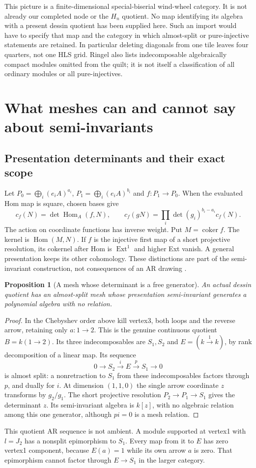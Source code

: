 \documentclass[11pt,oneside,openany]{book}
\newtheorem{proposition}[theorem]{Proposition}
\theoremstyle{definition}\newtheorem{definition}[theorem]{Definition}
\theoremstyle{remark}\newtheorem{remark}[theorem]{Remark}
\begin{document}
This picture is a finite-dimensional special-biserial wind-wheel category.
It is not already our completed node or the $H_n$ quotient. No map identifying
its algebra with a present dessin quotient has been supplied here. Such an
import would have to specify that map and the category in which almost-split
or pure-injective statements are retained. In particular deleting diagonals
from one tile leaves four quarters, not one HLS grid. Ringel also lists
indecomposable algebraically compact modules omitted from the quilt; it is not
itself a classification of all ordinary modules or all pure-injectives.

\section[Meshes and semi-invariants]{What meshes can and cannot say about semi-invariants}
\subsection{Presentation determinants and their exact scope}
Let $P_0=\bigoplus_i(e_iA)^{a_i}$, $P_1=\bigoplus_i(e_iA)^{b_i}$ and
$f:P_1\to P_0$. When the evaluated Hom map is square, chosen bases give
\[
 c_f(N)=\det\operatorname{Hom}_A(f,N),\qquad
 c_f(gN)=\prod_i\det(g_i)^{b_i-a_i}c_f(N).
\]
The action on coordinate functions has inverse weight. Put $M=\operatorname{coker}f$.
The kernel is $\operatorname{Hom}(M,N)$. If $f$ is the injective first map of a
short projective resolution, its cokernel after Hom
is $\operatorname{Ext}^1$ and higher Ext vanish. A general presentation keeps
its other cohomology. These distinctions are part of the semi-invariant
construction, not consequences of an AR drawing \cite{ARBSchofield}.

\begin{proposition}[A mesh whose determinant is a free generator]
\label{arb:freegenerator}
An actual dessin quotient has an almost-split mesh whose presentation
semi-invariant generates a polynomial algebra with no relation.
\end{proposition}
\begin{proof}
In the Chebyshev order above kill vertex3, both loops and the reverse arrow,
retaining only $a:1\to2$. This is the genuine continuous quotient
$B=k(1\to2)$. Its three indecomposables are $S_1,S_2$ and
$E=(k\xrightarrow1k)$, by rank decomposition of a linear map. Its sequence
\[
 0\to S_2\xrightarrow{i}E\xrightarrow{p}S_1\to0
\]
is almost split: a nonretraction to $S_1$ from these indecomposables factors
through $p$, and dually for $i$. At dimension $(1,1,0)$ the single arrow
coordinate $z$ transforms by $g_2/g_1$. The short projective resolution
$P_2\to P_1\to S_1$ gives the determinant $z$. Its semi-invariant algebra
is $k[z]$, with no algebraic relation among this one generator, although
$p i=0$ is a mesh relation.
\end{proof}
This quotient AR sequence is not ambient. A module supported at vertex1
with $l=J_2$ has a nonsplit epimorphism to $S_1$. Every map from it to $E$
has zero vertex1 component, because $E(a)=1$ while its own arrow $a$ is zero.
That epimorphism cannot factor through $E\to S_1$ in the larger category.
\end{document}

